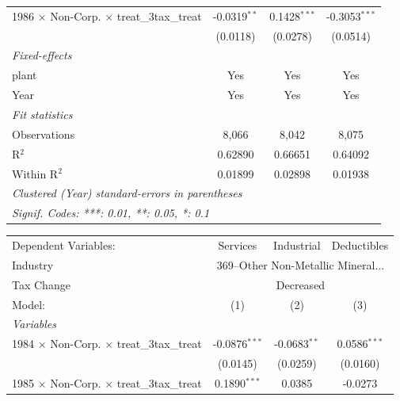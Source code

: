 \documentclass[
  12pt]{article}
\theoremstyle{definition}
\theoremstyle{remark}
\begin{document}
\begin{table}
\begin{minipage}{\linewidth}
\begin{tabular}{lccc}
   1986 $\times$ Non-Corp. $\times$ treat\_3tax\_treat     & -0.0319$^{**}$  & 0.1428$^{***}$ & -0.3053$^{***}$\\   
                                                           & (0.0118)        & (0.0278)       & (0.0514)\\   
   \midrule
   \emph{Fixed-effects}\\
   plant                                                   & Yes             & Yes            & Yes\\  
   Year                                                    & Yes             & Yes            & Yes\\  
   \midrule
   \emph{Fit statistics}\\
   Observations                                            & 8,066           & 8,042          & 8,075\\  
   R$^2$                                                   & 0.62890         & 0.66651        & 0.64092\\  
   Within R$^2$                                            & 0.01899         & 0.02898        & 0.01938\\  
   \midrule \midrule
   \multicolumn{4}{l}{\emph{Clustered (Year) standard-errors in parentheses}}\\
   \multicolumn{4}{l}{\emph{Signif. Codes: ***: 0.01, **: 0.05, *: 0.1}}\\
\end{tabular}
\par\endgroup
\begingroup
\centering
\begin{tabular}{lccc}
   \tabularnewline \midrule \midrule
   Dependent Variables:                                    & Services        & Industrial      & Deductibles\\  
   Industry & \multicolumn{3}{c}{369–Other Non-Metallic Mineral...} \\ 
   Tax Change & \multicolumn{3}{c}{Decreased} \\ 
   Model:                                                  & (1)             & (2)             & (3)\\  
   \midrule
   \emph{Variables}\\
   1984 $\times$ Non-Corp. $\times$ treat\_3tax\_treat     & -0.0876$^{***}$ & -0.0683$^{**}$  & 0.0586$^{***}$\\   
                                                           & (0.0145)        & (0.0259)        & (0.0160)\\   
   1985 $\times$ Non-Corp. $\times$ treat\_3tax\_treat     & 0.1890$^{***}$  & 0.0385          & -0.0273\\   

\end{tabular}
\end{minipage}
\end{table}
\end{document}
